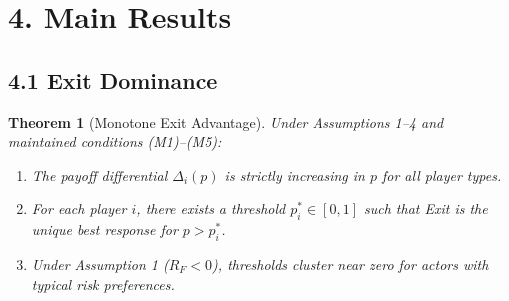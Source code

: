 \documentclass[12pt]{article}
\newtheorem{theorem}{Theorem}
\theoremstyle{definition}
\theoremstyle{remark}
\begin{document}

\section{4. Main Results}

\subsection{4.1 Exit Dominance}

\begin{theorem}[Monotone Exit Advantage]
Under Assumptions 1--4 and maintained conditions (M1)--(M5):

\begin{enumerate}[label=(\roman*)]
\item The payoff differential $\Delta_i(p)$ is strictly increasing in $p$
for all player types.
\item For each player $i$, there exists a threshold $p_i^* \in [0, 1]$
such that Exit is the unique best response for $p > p_i^*$.
\item Under Assumption 1 ($R_F < 0$), thresholds cluster near zero
for actors with typical risk preferences.
\end{enumerate}
\end{theorem}
\end{document}
